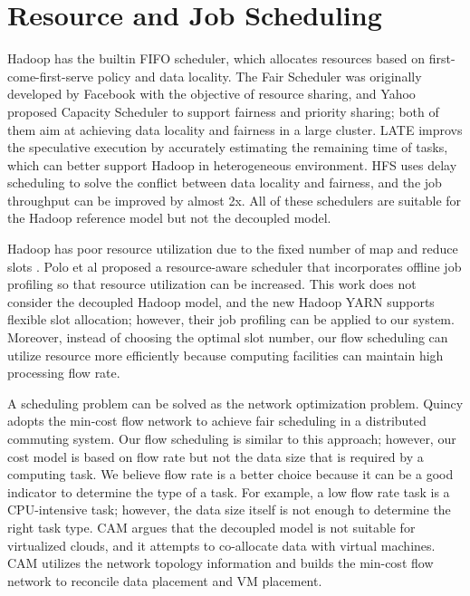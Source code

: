 \section{Resource and Job Scheduling}

Hadoop has the builtin FIFO scheduler, which allocates resources based on first-come-first-serve policy and data locality.
The Fair Scheduler was originally developed by Facebook with the objective of resource sharing, and Yahoo proposed Capacity Scheduler to support fairness and priority sharing; both of them aim at achieving data locality and fairness in a large cluster.
LATE \cite{ZahariaM2008_LATE} improvs the speculative execution by accurately estimating the remaining time of tasks, which can better support Hadoop in heterogeneous environment.
HFS \cite{ZahariaM2010_DelayScheduling} uses delay scheduling to solve the conflict between data locality and fairness, and the job throughput can be improved by almost 2x.
All of these schedulers are suitable for the Hadoop reference model but not the decoupled model.

Hadoop has poor resource utilization due to the fixed number of map and reduce slots \cite{PoloJ2011_ResourceAware}.
Polo et al proposed a resource-aware scheduler that incorporates offline job profiling so that resource utilization  can be increased.
This work does not consider the decoupled Hadoop model, and the new Hadoop YARN supports flexible slot allocation; however, their job profiling can be applied to our system.
Moreover, instead of choosing the optimal slot number, our flow scheduling can utilize resource more efficiently because computing facilities can maintain high processing flow rate.

A scheduling problem can be solved as the network optimization problem.
Quincy \cite{IsardM2009_Quincy} adopts the min-cost flow network to achieve fair scheduling in a distributed commuting system.
Our flow scheduling is similar to this approach; however, our cost model is based on flow rate but not the data size that is required by a computing task.
We believe flow rate is a better choice because it can be a good indicator to determine the type of a task.
For example, a low flow rate task is a CPU-intensive task; however, the data size itself is not enough to determine the right task type.
CAM \cite{LiM2012_CAM} argues that the decoupled model is not suitable for virtualized clouds, and it attempts to co-allocate data with virtual machines.
CAM utilizes the network topology information and builds the min-cost flow network to reconcile data placement and VM placement.